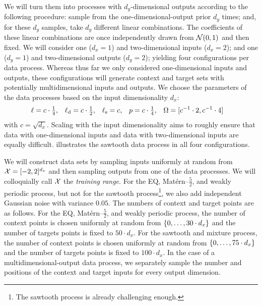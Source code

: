 \documentclass[12pt, twoside]{report}
\begin{document}
We will turn them into processes with $d_y$-dimensional outputs according to the following procedure:
sample from the one-dimensional-output prior $d_y$ times;
and, for these $d_y$ samples, take $d_y$ different linear combinations.
The coefficients of these linear combinations are once independently drawn from $\mathcal{N}(0,1)$ and then fixed.
We will consider one ($d_x = 1$) and two-dimensional inputs ($d_x = 2$); and one ($d_y = 1$) and two-dimensional outputs ($d_y = 2$);
yielding four configurations per data process.
Whereas thus far we only considered one-dimensional inputs and outputs,
these configurations will generate context and target sets with potentially multidimensional inputs and outputs.
We choose the parameters of the data processes based on the input dimensionality $d_x$:
\begin{align}
    \ell &= c \cdot\tfrac14, &
    \ell\ss{d} &= c \cdot\tfrac12, &
    \ell\ss{s} &= c, &
    p &= c \cdot\tfrac14, &
    \Omega &= [c^{-1} \cdot 2, c^{-1} \cdot 4]
\end{align}
with $c = \sqrt{d_x}$.
Scaling with the input dimensionality aims to roughly ensure that data with one-dimensional inputs and data with two-dimensional inputs are equally difficult.
 illustrates the sawtooth data process in all four configurations.

We will construct data sets by sampling inputs uniformly at random from
$\mathcal{X} = [-2, 2]^{d_x}$
and then sampling outputs from one of the data processes.
We will colloquially call $\mathcal{X}$ the \emph{training range}.
For the EQ, Mat\'ern--$\frac52$, and weakly periodic process, but not for the sawtooth process\footnote{
    The sawtooth process is already challenging enough.
},
we also add independent Gaussian noise with variance $0.05$.
The numbers of context and target points are as follows.
For the EQ, Mat\'ern--$\frac52$, and weakly periodic process,
the number of context points is chosen uniformly at random from $\{0, \ldots, 30 \cdot d_x\}$ and
the number of targets points is fixed to $50 \cdot d_x$.
For the sawtooth and mixture process,
the number of context points is chosen uniformly at random from $\{0, \ldots, 75 \cdot d_x\}$ and
the number of targets points is fixed to $100 \cdot d_x$.
In the case of a multidimensional-output data process, we separately sample the number and positions of the context and target inputs for every output dimension.
\end{document}
